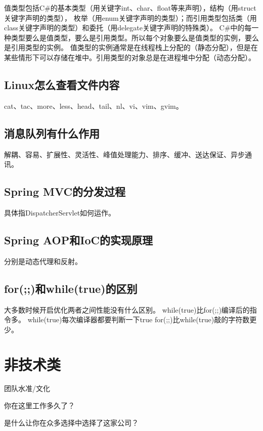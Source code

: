 \documentclass{book}
\begin{document}
值类型包括C\#的基本类型（用关键字int、char、float等来声明），结构（用struct关键字声明的类型），
枚举（用enum关键字声明的类型）；而引用类型包括类（用class关键字声明的类型）和委托（用delegate关键字声明的特殊类）。
C\#中的每一种类型要么是值类型，要么是引用类型。所以每个对象要么是值类型的实例，要么是引用类型的实例。
值类型的实例通常是在线程栈上分配的（静态分配），但是在某些情形下可以存储在堆中。引用类型的对象总是在进程堆中分配（动态分配）。

\subsection{Linux怎么查看文件内容}

cat、tac、more、less、head、tail、nl、vi、vim、gvim。

\subsection{消息队列有什么作用}

解耦、容易、扩展性、灵活性、峰值处理能力、排序、缓冲、送达保证、异步通讯。

\subsection{Spring MVC的分发过程}

具体指DispatcherServlet如何运作。

\subsection{Spring AOP和IoC的实现原理}

分别是动态代理和反射。

\subsection{for(;;)和while(true)的区别}

大多数时候开启优化两者之间性能没有什么区别。
while(true)比for(;;)编译后的指令多。
while(true)每次编译器都要判断一下true
for(;;)比while(true)敲的字符数更少。

\section{非技术类}

团队水准/文化

你在这里工作多久了？

是什么让你在众多选择中选择了这家公司？
\end{document}
